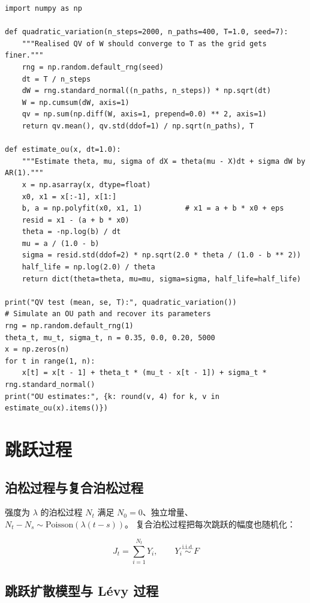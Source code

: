 \begin{lstlisting}[style=pythonstyle, caption={布朗运动的二次变差验证与 OU 参数估计}, label={lst:10-ou}]
import numpy as np

def quadratic_variation(n_steps=2000, n_paths=400, T=1.0, seed=7):
    """Realised QV of W should converge to T as the grid gets finer."""
    rng = np.random.default_rng(seed)
    dt = T / n_steps
    dW = rng.standard_normal((n_paths, n_steps)) * np.sqrt(dt)
    W = np.cumsum(dW, axis=1)
    qv = np.sum(np.diff(W, axis=1, prepend=0.0) ** 2, axis=1)
    return qv.mean(), qv.std(ddof=1) / np.sqrt(n_paths), T

def estimate_ou(x, dt=1.0):
    """Estimate theta, mu, sigma of dX = theta(mu - X)dt + sigma dW by AR(1)."""
    x = np.asarray(x, dtype=float)
    x0, x1 = x[:-1], x[1:]
    b, a = np.polyfit(x0, x1, 1)          # x1 = a + b * x0 + eps
    resid = x1 - (a + b * x0)
    theta = -np.log(b) / dt
    mu = a / (1.0 - b)
    sigma = resid.std(ddof=2) * np.sqrt(2.0 * theta / (1.0 - b ** 2))
    half_life = np.log(2.0) / theta
    return dict(theta=theta, mu=mu, sigma=sigma, half_life=half_life)

print("QV test (mean, se, T):", quadratic_variation())
# Simulate an OU path and recover its parameters
rng = np.random.default_rng(1)
theta_t, mu_t, sigma_t, n = 0.35, 0.0, 0.20, 5000
x = np.zeros(n)
for t in range(1, n):
    x[t] = x[t - 1] + theta_t * (mu_t - x[t - 1]) + sigma_t * rng.standard_normal()
print("OU estimates:", {k: round(v, 4) for k, v in estimate_ou(x).items()})
\end{lstlisting}

\section{跳跃过程}

\subsection{泊松过程与复合泊松过程}

强度为 $\lambda$ 的泊松过程 $N_t$ 满足 $N_0=0$、独立增量、$N_t-N_s\sim\text{Poisson}\left(\lambda(t-s)\right)$。
复合泊松过程把每次跳跃的幅度也随机化：

\begin{equation}
  J_t = \sum_{i=1}^{N_t}Y_i, \qquad Y_i\stackrel{\text{i.i.d.}}{\sim}F
  \label{eq:10-compound}
\end{equation}

\subsection{跳跃扩散模型与 Lévy 过程}

